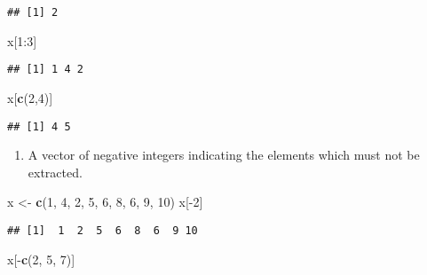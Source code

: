\documentclass[]{book}
\newenvironment{Shaded}{\begin{snugshade}}{\end{snugshade}}
\newcommand{\KeywordTok}[1]{\textcolor[rgb]{0.13,0.29,0.53}{\textbf{{#1}}}}
\newcommand{\DecValTok}[1]{\textcolor[rgb]{0.00,0.00,0.81}{{#1}}}
\newcommand{\StringTok}[1]{\textcolor[rgb]{0.31,0.60,0.02}{{#1}}}
\newcommand{\NormalTok}[1]{{#1}}
\providecommand{\tightlist}{%
  \setlength{\itemsep}{0pt}\setlength{\parskip}{0pt}}
\def\tightlist{}
\begin{document}
\begin{verbatim}
## [1] 2
\end{verbatim}

\begin{Shaded}
\begin{Highlighting}[]
\NormalTok{x[}\DecValTok{1}\NormalTok{:}\DecValTok{3}\NormalTok{]}
\end{Highlighting}
\end{Shaded}

\begin{verbatim}
## [1] 1 4 2
\end{verbatim}

\begin{Shaded}
\begin{Highlighting}[]
\NormalTok{x[}\KeywordTok{c}\NormalTok{(}\DecValTok{2}\NormalTok{,}\DecValTok{4}\NormalTok{)]}
\end{Highlighting}
\end{Shaded}

\begin{verbatim}
## [1] 4 5
\end{verbatim}

\begin{enumerate}
\def\labelenumi{\arabic{enumi}.}
\setcounter{enumi}{1}
\tightlist
\item
  A vector of negative integers indicating the elements which must not
  be extracted.
\end{enumerate}

\begin{Shaded}
\begin{Highlighting}[]
\NormalTok{x <-}\StringTok{ }\KeywordTok{c}\NormalTok{(}\DecValTok{1}\NormalTok{, }\DecValTok{4}\NormalTok{, }\DecValTok{2}\NormalTok{, }\DecValTok{5}\NormalTok{, }\DecValTok{6}\NormalTok{, }\DecValTok{8}\NormalTok{, }\DecValTok{6}\NormalTok{, }\DecValTok{9}\NormalTok{, }\DecValTok{10}\NormalTok{)}
\NormalTok{x[-}\DecValTok{2}\NormalTok{]}
\end{Highlighting}
\end{Shaded}

\begin{verbatim}
## [1]  1  2  5  6  8  6  9 10
\end{verbatim}

\begin{Shaded}
\begin{Highlighting}[]
\NormalTok{x[-}\KeywordTok{c}\NormalTok{(}\DecValTok{2}\NormalTok{, }\DecValTok{5}\NormalTok{, }\DecValTok{7}\NormalTok{)]}
\end{Highlighting}
\end{Shaded}
\end{document}
